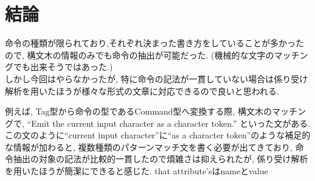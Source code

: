 \documentclass[uplatex,a4j]{jsreport}
\begin{document}
\chapter{結論}
命令の種類が限られており,それぞれ決まった書き方をしていることが多かったので,
構文木の情報のみでも命令の抽出が可能だった. (機械的な文字のマッチングでも出来そうではあった.)\\
しかし今回はやらなかったが, 特に命令の記法が一貫していない場合は係り受け解析を用いたほうが様々な形式の文章に対応できるので良いと思われる.

例えば, Tag型から命令の型であるCommand型へ変換する際, 
構文木のマッチングで, 
``Emit the current input character as a character token.''
といった文がある. この文のように``current input character''に``as a character token''のような補足的な情報が加わると, 複数種類のパターンマッチ文を書く必要が出てきており, 
命令抽出の対象の記法が比較的一貫したので煩雑さは抑えられたが, 
係り受け解析を用いたほうが簡潔にできると感じた.
that attribute'sはnameとvalue

\end{document}
